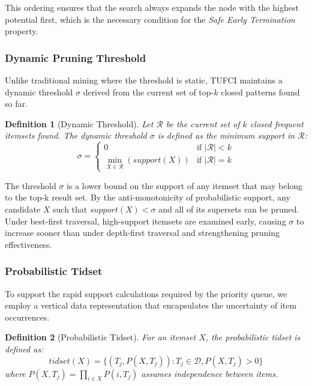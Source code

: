 \documentclass[10pt,letterpaper]{article}
\newtheorem{definition}{Definition}[section]
\newcounter{definition}
\begin{document}
This ordering ensures that the search always expands the node with the highest potential first, which is the necessary condition for the \textit{Safe Early Termination} property.

\subsubsection*{Dynamic Pruning Threshold}

Unlike traditional mining where the threshold is static, TUFCI maintains a dynamic threshold $\sigma$ derived from the current set of top-$k$ closed patterns found so far.

\begin{definition}[Dynamic Threshold]
Let $\mathcal{R}$ be the current set of $k$ closed frequent itemsets found. The dynamic threshold $\sigma$ is defined as the minimum support in $\mathcal{R}$:
\begin{equation}
\sigma = \begin{cases} 
0 & \text{if } |\mathcal{R}| < k \\
\min_{X \in \mathcal{R}} (\mathit{support}(X)) & \text{if } |\mathcal{R}| = k
\end{cases}
\end{equation}
\end{definition}
The threshold $\sigma$ is a lower bound on the support of any itemset that may belong to the top-k result set. By the anti-monotonicity of probabilistic support, any candidate $X$ such that
$\mathit{support}(X) < \sigma $ and all of its supersets can be pruned. Under best-first traversal, high-support itemsets are examined early, causing $\sigma$ to increase sooner than under depth-first traversal and strengthening pruning effectiveness.


\subsubsection*{Probabilistic Tidset}
\label{subsubsec:ptidset}

To support the rapid support calculations required by the priority queue, we employ a vertical data representation that encapsulates the uncertainty of item occurrences.

\begin{definition}[Probabilistic Tidset]
\label{def:ptidset}
For an itemset $X$, the probabilistic tidset is defined as:
\begin{equation}
\mathit{tidset}(X) = \{(T_j, P(X, T_j)) : T_j \in \mathcal{D}, P(X, T_j) > 0\}
\end{equation}
where $P(X, T_j) = \prod_{i \in X} P(i, T_j)$ assumes independence between items.
\end{definition}
\end{document}
